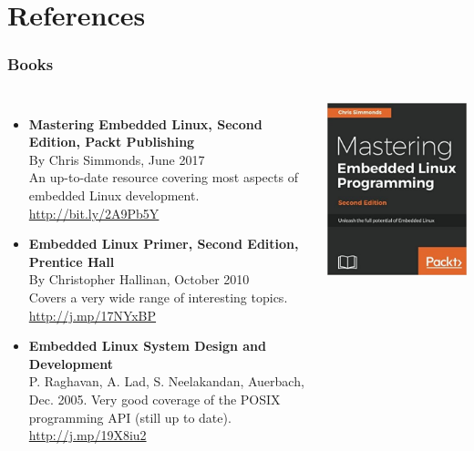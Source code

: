 \section{References}

\begin{frame}
  \frametitle{Books}
  \begin{columns}
    \small
    \begin{itemize}
    \item {\bf Mastering Embedded Linux, Second Edition, Packt
      Publishing}\\
      By Chris Simmonds, June 2017\\
      An up-to-date resource covering most aspects of embedded Linux
      development.\\
      \url{http://bit.ly/2A9Pb5Y}
    \item {\bf Embedded Linux Primer, Second Edition, Prentice Hall}\\
      By Christopher Hallinan, October 2010\\
      Covers a very wide range of interesting topics.\\
      \url{http://j.mp/17NYxBP}
    \item {\bf Embedded Linux System Design and Development}\\
      P. Raghavan, A. Lad, S. Neelakandan, Auerbach, Dec. 2005.
      Very good coverage of the POSIX programming API (still up
      to date).\\
      \url{http://j.mp/19X8iu2}
    \end{itemize}
    \normalsize
    \includegraphics[height=0.25\textheight]{slides/sysdev-references/book-mastering-embedded-linux2.jpg}\\

\end{columns}
\end{frame}
